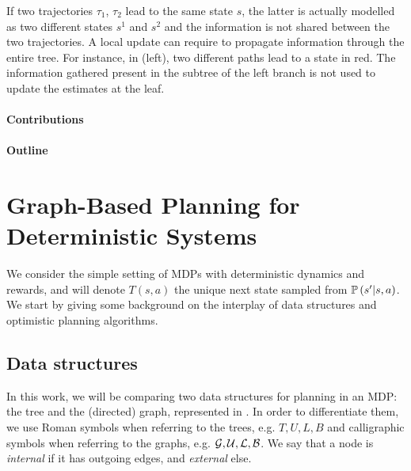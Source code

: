 \documentclass[runningheads]{llncs}
\begin{document}
If two trajectories $\tau_1$, $\tau_2$ lead to the same state $s$, the latter is actually modelled as two different states $s^1$ and $s^2$ and the information is not shared between the two trajectories. A local update can require to propagate information through the entire tree. For instance, in  (left), two different paths lead to a state in red. The information gathered present in the subtree of the left branch is not used to update the estimates at the leaf.

\paragraph{Contributions}

\paragraph{Outline}


\section{Graph-Based Planning for Deterministic Systems}
\label{sec:gbopd}

We consider the simple setting of MDPs with deterministic dynamics and rewards, and will denote $T(s,a)$ the unique next state sampled from $\mathbb{P}\left(s'|s,a\right)$.
We start by giving some background on the interplay of data structures and optimistic planning algorithms.

\subsection{Data structures}

In this work, we will be comparing two data structures for planning in an MDP: the tree and the (directed) graph, represented in . In order to differentiate them, we use Roman symbols when referring to the trees, e.g. $T, U, L, B$ and calligraphic symbols when referring to the graphs, e.g. $\mathcal{G}, \mathcal{U}, \mathcal{L}, \mathcal{B}$. We say that a node is \emph{internal} if it has outgoing edges, and \emph{external} else.
\end{document}
